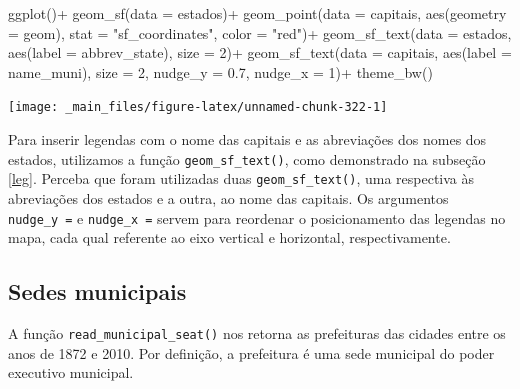 \documentclass[
  brazilian,
]{book}
\newenvironment{Shaded}{\begin{snugshade}}{\end{snugshade}}
\newcommand{\AttributeTok}[1]{\textcolor[rgb]{0.77,0.63,0.00}{#1}}
\newcommand{\DecValTok}[1]{\textcolor[rgb]{0.00,0.00,0.81}{#1}}
\newcommand{\FloatTok}[1]{\textcolor[rgb]{0.00,0.00,0.81}{#1}}
\newcommand{\FunctionTok}[1]{\textcolor[rgb]{0.00,0.00,0.00}{#1}}
\newcommand{\NormalTok}[1]{#1}
\newcommand{\SpecialCharTok}[1]{\textcolor[rgb]{0.00,0.00,0.00}{#1}}
\newcommand{\StringTok}[1]{\textcolor[rgb]{0.31,0.60,0.02}{#1}}
\begin{document}
\begin{Shaded}
\begin{Highlighting}[]
\FunctionTok{ggplot}\NormalTok{()}\SpecialCharTok{+}
  \FunctionTok{geom\_sf}\NormalTok{(}\AttributeTok{data =}\NormalTok{ estados)}\SpecialCharTok{+}
  \FunctionTok{geom\_point}\NormalTok{(}\AttributeTok{data =}\NormalTok{ capitais,}
             \FunctionTok{aes}\NormalTok{(}\AttributeTok{geometry =}\NormalTok{ geom),}
             \AttributeTok{stat =} \StringTok{"sf\_coordinates"}\NormalTok{,}
             \AttributeTok{color =} \StringTok{"red"}\NormalTok{)}\SpecialCharTok{+}
  \FunctionTok{geom\_sf\_text}\NormalTok{(}\AttributeTok{data =}\NormalTok{ estados,}
               \FunctionTok{aes}\NormalTok{(}\AttributeTok{label =}\NormalTok{ abbrev\_state),}
               \AttributeTok{size =} \DecValTok{2}\NormalTok{)}\SpecialCharTok{+}
  \FunctionTok{geom\_sf\_text}\NormalTok{(}\AttributeTok{data =}\NormalTok{ capitais,}
               \FunctionTok{aes}\NormalTok{(}\AttributeTok{label =}\NormalTok{ name\_muni),}
               \AttributeTok{size =} \DecValTok{2}\NormalTok{,}
               \AttributeTok{nudge\_y =} \FloatTok{0.7}\NormalTok{,}
               \AttributeTok{nudge\_x =} \DecValTok{1}\NormalTok{)}\SpecialCharTok{+}
  \FunctionTok{theme\_bw}\NormalTok{()}
\end{Highlighting}
\end{Shaded}

\begin{center}\texttt{[image: \_main\_files/figure-latex/unnamed-chunk-322-1]} \end{center}

Para inserir legendas com o nome das capitais e as abreviações dos nomes dos estados, utilizamos a função \texttt{geom\_sf\_text()}, como demonstrado na subseção \ref{leg}. Perceba que foram utilizadas duas \texttt{geom\_sf\_text()}, uma respectiva às abreviações dos estados e a outra, ao nome das capitais. Os argumentos \texttt{nudge\_y\ =} e \texttt{nudge\_x\ =} servem para reordenar o posicionamento das legendas no mapa, cada qual referente ao eixo vertical e horizontal, respectivamente.

\hypertarget{sedes-municipais}{%
\subsection{Sedes municipais}\label{sedes-municipais}}

A função \texttt{read\_municipal\_seat()} nos retorna as prefeituras das cidades entre os anos de 1872 e 2010. Por definição, a prefeitura é uma sede municipal do poder executivo municipal.
\end{document}

